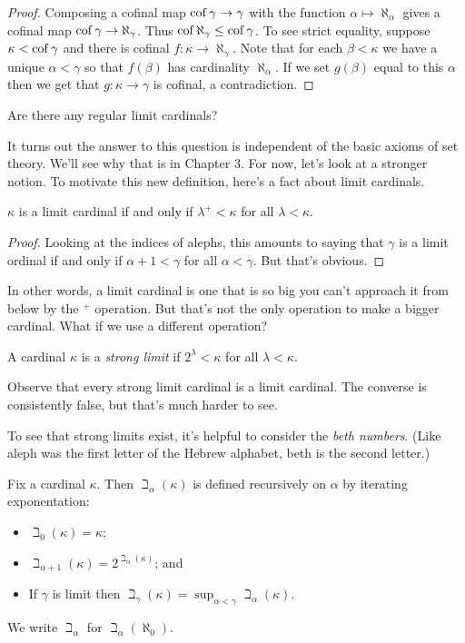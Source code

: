 \documentclass[10pt]{amsart}
\begin{document}
\begin{proof}
Composing a cofinal map $\operatorname{cof} \gamma \to \gamma$ with the function $\alpha \mapsto \aleph_\alpha$ gives a cofinal map $\operatorname{cof} \gamma \to \aleph_\gamma$. Thus $\operatorname{cof} \aleph_\gamma \le \operatorname{cof} \gamma$. To see strict equality, suppose $\kappa < \operatorname{cof} \gamma$ and there is cofinal $f : \kappa \to \aleph_\gamma$. Note that for each $\beta < \kappa$ we have a unique $\alpha < \gamma$ so that $f(\beta)$ has cardinality $\aleph_\alpha$. If we set $g(\beta)$ equal to this $\alpha$ then we get that $g : \kappa \to \gamma$ is cofinal, a contradiction.
\end{proof}

Are there any regular limit cardinals? 

It turns out the answer to this question is independent of the basic axioms of set theory. We'll see why that is in Chapter 3. For now, let's look at a stronger notion. To motivate this new definition, here's a fact about limit cardinals.

\begin{proposition}
$\kappa$ is a limit cardinal if and only if $\lambda^+ < \kappa$ for all $\lambda < \kappa$.
\end{proposition}

\begin{proof}
Looking at the indices of alephs, this amounts to saying that $\gamma$ is a limit ordinal if and only if $\alpha + 1 < \gamma$ for all $\alpha < \gamma$. But that's obvious.
\end{proof}

In other words, a limit cardinal is one that is so big you can't approach it from below by the ${}^+$ operation. But that's not the only operation to make a bigger cardinal. What if we use a different operation?

\begin{definition}
A cardinal $\kappa$ is a \emph{strong limit} if $2^\lambda < \kappa$ for all $\lambda < \kappa$.
\end{definition}

Observe that every strong limit cardinal is a limit cardinal. The converse is consistently false, but that's much harder to see.

To see that strong limits exist, it's helpful to consider the \emph{beth numbers}. (Like aleph was the first letter of the Hebrew alphabet, beth is the second letter.)

\begin{definition}
Fix a cardinal $\kappa$. Then $\beth_\alpha(\kappa)$ is defined recursively on $\alpha$ by iterating exponentation:
\begin{itemize}
\item $\beth_0(\kappa) = \kappa$;
\item $\beth_{\alpha+1}(\kappa) = 2^{\beth_\alpha(\kappa)}$; and
\item If $\gamma$ is limit then $\beth_\gamma(\kappa) = \sup_{\alpha < \gamma} \beth_\alpha(\kappa)$.
\end{itemize}
We write $\beth_\alpha$ for $\beth_\alpha(\aleph_0)$.
\end{definition}
\end{document}
